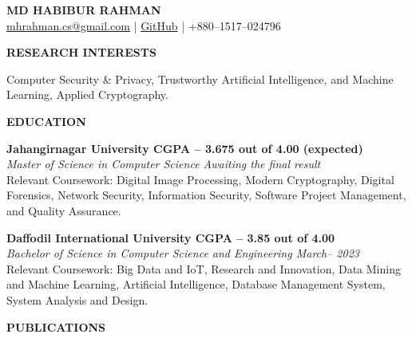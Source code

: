 \documentclass[a4paper, 12pt]{article}
\begin{document}
	
	\begin{center}
		\textbf{\LARGE{MD HABIBUR RAHMAN}} \\
		{\href{mailto:mhrahman.cs@gmail.com}{mhrahman.cs@gmail.com}} | {\href{https://github.com/csrahman}{GitHub}} | {+880--1517--024796}
	\end{center}

	\begin{flushleft}
		\noindent
		\textbf{RESEARCH INTERESTS}\hrulefill
	\end{flushleft}
	\vspace{-12pt}

    Computer Security \& Privacy, Trustworthy Artificial Intelligence, and Machine Learning, Applied Cryptography.



 
	\begin{flushleft}
		\noindent
		\textbf{EDUCATION}\hrulefill
	\end{flushleft}
	\vspace{-12pt}
	
	\textbf{Jahangirnagar University \hfill CGPA -- 3.675 out of 4.00 (expected)} \\
	\textit{Master of Science in Computer Science \hfill Awaiting the final result} \\
    Relevant Coursework: Digital Image Processing, Modern Cryptography, Digital Forensics, Network Security, Information Security, Software Project Management, and Quality Assurance.
	\vspace{12pt}
	
	\textbf{Daffodil International University \hfill CGPA -- 3.85 out of 4.00} \\
	\textit{Bachelor of Science in Computer Science and Engineering \hfill March-- 2023} \\
    Relevant Coursework: Big Data and IoT, Research and Innovation, Data Mining and Machine Learning, Artificial Intelligence, Database Management System, System Analysis and Design.
	

\begin{flushleft}
	\noindent
	\textbf{PUBLICATIONS}\hrulefill
\end{flushleft}
\vspace{-12pt}
\end{document}
